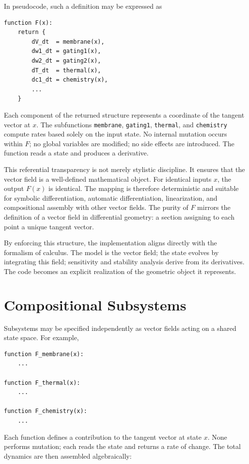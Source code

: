 \documentclass[12pt]{book}
\begin{document}
In pseudocode, such a definition may be expressed as

\begin{verbatim}
function F(x):
    return {
        dV_dt  = membrane(x),
        dw1_dt = gating1(x),
        dw2_dt = gating2(x),
        dT_dt  = thermal(x),
        dc1_dt = chemistry(x),
        ...
    }
\end{verbatim}

Each component of the returned structure represents a coordinate of
the tangent vector at $x$. The subfunctions \texttt{membrane},
\texttt{gating1}, \texttt{thermal}, and \texttt{chemistry} compute
rates based solely on the input state. No internal mutation occurs
within $F$; no global variables are modified; no side effects are
introduced. The function reads a state and produces a derivative.

This referential transparency is not merely stylistic discipline. It
ensures that the vector field is a well-defined mathematical object.
For identical inputs $x$, the output $F(x)$ is identical. The mapping
is therefore deterministic and suitable for symbolic differentiation,
automatic differentiation, linearization, and compositional assembly
with other vector fields. The purity of $F$ mirrors the definition of
a vector field in differential geometry: a section assigning to each
point a unique tangent vector.

By enforcing this structure, the implementation aligns directly with
the formalism of calculus. The model is the vector field; the state
evolves by integrating this field; sensitivity and stability analysis
derive from its derivatives. The code becomes an explicit realization
of the geometric object it represents.

\section{Compositional Subsystems}

Subsystems may be specified independently as vector fields acting on a
shared state space. For example,

\begin{verbatim}
function F_membrane(x):
    ...

function F_thermal(x):
    ...

function F_chemistry(x):
    ...
\end{verbatim}

Each function defines a contribution to the tangent vector at state
$x$. None performs mutation; each reads the state and returns a rate of
change. The total dynamics are then assembled algebraically:
\end{document}
